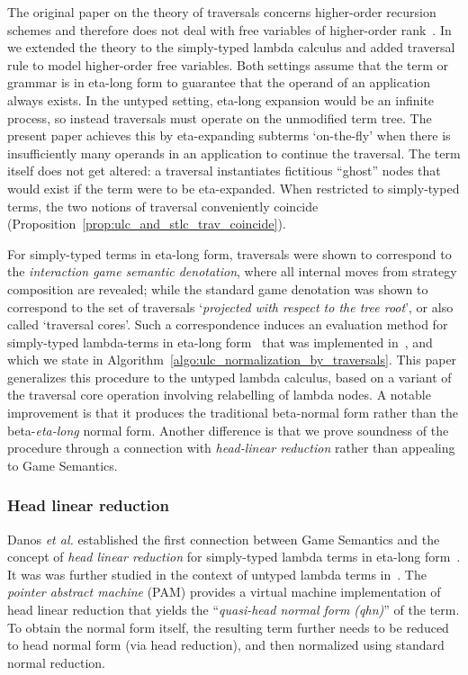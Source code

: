 \documentclass{elsarticle}
\makeatletter
\theoremstyle{plain}
\theoremstyle{definition}
\def\etal{\textit{et al.}\@\xspace}
\makeatother
\begin{document}
The original paper on the theory of traversals concerns higher-order recursion schemes and therefore does not deal with free variables of higher-order rank~\cite{OngLics2006}. In~\cite{BlumPhd} we extended the theory to the simply-typed lambda calculus and added traversal rule to model higher-order free variables. Both settings assume that the term or grammar is in eta-long form to guarantee that the operand of an application always exists.
In the untyped setting, eta-long expansion would be an infinite process, so instead traversals must operate on the unmodified term tree.
The present paper achieves this by eta-expanding subterms `on-the-fly' when there is insufficiently many operands in an application to continue the traversal. The term itself does not get altered: a traversal instantiates fictitious ``ghost'' nodes that would exist if the term were to be eta-expanded.
When restricted to simply-typed terms, the two notions of traversal conveniently coincide (Proposition~\ref{prop:ulc_and_stlc_trav_coincide}).

For simply-typed terms in eta-long form, traversals were shown to correspond to the \emph{interaction game semantic denotation}, where all internal moves from strategy composition are revealed; while the standard game denotation was shown to correspond to the set of traversals `\emph{projected with respect to the tree root}', or also called `traversal cores'. Such a correspondence induces an evaluation method for simply-typed lambda-terms in eta-long form~\cite{BlumPhd,BlumGalop2008,Ong-NormByTrav2015} that was implemented in~\cite{Blum-HogTool}, and which we state in Algorithm~\ref{algo:ulc_normalization_by_traversals}. This paper generalizes this procedure to the untyped lambda calculus, based on a variant of the traversal core operation involving relabelling of lambda nodes. A notable improvement is that it produces the traditional beta-normal form rather than the beta-\emph{eta-long} normal form. Another difference is that we prove soundness of the procedure through a connection with \emph{head-linear reduction} rather than appealing to Game Semantics.

\subsubsection{Head linear reduction}
Danos \etal established the first connection between Game Semantics and the concept of \emph{head linear reduction} for simply-typed lambda terms in eta-long form~\cite{danosherbelinregnier1996}. It was was further studied in the context of untyped lambda terms in~\cite{danos-head}. The \emph{pointer abstract machine} (PAM) provides a virtual machine implementation of head linear reduction that yields the ``\emph{quasi-head normal form (qhn)}'' of the term. To obtain the normal form itself, the resulting term further needs to be reduced to head normal form (via head reduction), and then normalized using standard normal reduction.
\end{document}
